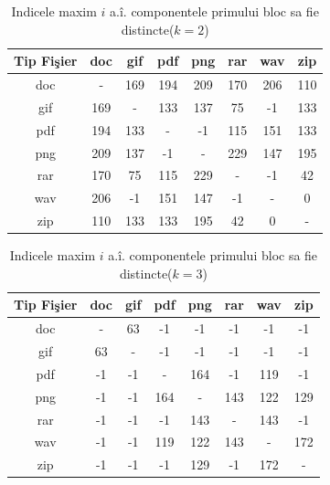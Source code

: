 \documentclass{llncs}
\begin{document}
\begin{table}[b]
\begin{center}
\caption{Indicele maxim $i$ a.\^{i}. componentele primului bloc sa fie distincte($k=2$)}\label{tb:margins}
\label{table:k2}
\begin{tabular}{cccccccc}
Tip Fi\c{s}ier & doc & gif & pdf & png & rar & wav & zip \\\hline
  doc & - & 169 & 194 & 209 & 170 & 206 & 110\\
  gif & 169 & - & 133 & 137 & 75 & -1 & 133\\
  pdf & 194 & 133 & - & -1 & 115 & 151 & 133\\
  png & 209 & 137 & -1 & - & 229 & 147 & 195\\
  rar & 170 & 75 & 115 & 229 & - & -1 & 42\\
  wav & 206 & -1 & 151 & 147 & -1 & - & 0\\
  zip & 110 & 133 & 133 & 195 & 42 & 0 & -\\ \hline
\end{tabular}
\end{center}
\end{table}


\begin{table}[H]
\begin{center}
\caption{Indicele maxim $i$ a.\^{i}. componentele primului bloc sa fie distincte($k=3$)}\label{tb:margins}
\label{table:k3}
\begin{tabular}{cccccccc}
Tip Fi\c{s}ier & doc & gif & pdf & png & rar & wav & zip \\\hline
  doc & - & 63 & -1 & -1 & -1 & -1 & -1\\
  gif & 63 & - & -1 & -1 & -1 & -1 & -1\\
  pdf & -1 & -1 & - & 164 & -1 & 119 & -1\\
  png & -1 & -1 & 164 & - & 143 & 122 & 129\\
  rar & -1 & -1 & -1 & 143 & - & 143 & -1\\
  wav & -1 & -1 & 119 & 122 & 143 & - & 172\\
  zip & -1 & -1 & -1 & 129 & -1 & 172 & -\\ \hline
\end{tabular}
\end{center}
\bigskip
\end{table}
\end{document}
